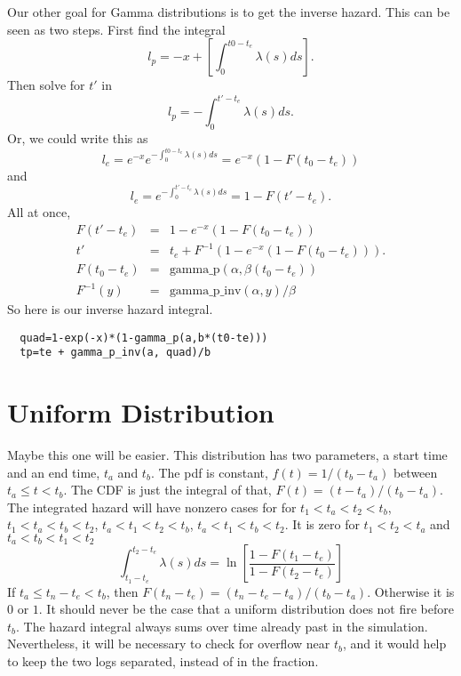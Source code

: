 \documentclass{article}
\begin{document}
Our other goal for Gamma distributions is to get the inverse hazard.
This can be seen as two steps. First find the integral
\begin{equation}
  l_p=-x+\left[\int_0^{t0-t_e}\lambda(s)ds\right].
\end{equation}
Then solve for $t'$ in
\begin{equation}
  l_p=-\int_0^{t'-t_e}\lambda(s)ds.
\end{equation}
Or, we could write this as
\begin{equation}
  l_e =e^{-x}e^{-\int_0^{t0-t_e}\lambda(s)ds}=e^{-x}(1-F(t_0-t_e))
\end{equation}
and
\begin{equation}
  l_e=e^{-\int_0^{t'-t_e}\lambda(s)ds}=1-F(t'-t_e).
\end{equation}
All at once,
\begin{eqnarray}
  F(t'-t_e)&=&1-e^{-x}(1-F(t_0-t_e)) \\
 t'&=&t_e+F^{-1}\left(1-e^{-x}(1-F(t_0-t_e))\right). \\
 F(t_0-t_e)&=&\mbox{gamma\_p}(\alpha,\beta(t_0-t_e)) \\
 F^{-1}(y)&=&\mbox{gamma\_p\_inv}(\alpha, y)/\beta
\end{eqnarray}
So here is our inverse hazard integral.
\begin{lstlisting}
  quad=1-exp(-x)*(1-gamma_p(a,b*(t0-te)))
  tp=te + gamma_p_inv(a, quad)/b
\end{lstlisting}

\section{Uniform Distribution}
Maybe this one will be easier.
This distribution has two parameters, a start time
and an end time, $t_a$ and $t_b$.
The pdf is constant, $f(t)=1/(t_b-t_a)$ between
$t_a\le t<t_b$. The CDF is just the integral of
that, $F(t)=(t-t_a)/(t_b-t_a)$.
The integrated hazard will have nonzero cases for
for $t_1<t_a<t_2<t_b$, $t_1<t_a<t_b<t_2$,
$t_a<t_1<t_2<t_b$, $t_a<t_1<t_b<t_2$.
It is zero for $t_1<t_2<t_a$ and $t_a<t_b<t_1<t_2$
\begin{equation}
  \int_{t_1-t_e}^{t_2-t_e}\lambda(s)ds=
      \ln\left[\frac{1-F(t_1-t_e)}{1-F(t_2-t_e)}\right]
\end{equation}
If $t_a\le t_n-t_e<t_b$, then $F(t_n-t_e)=(t_n-t_e-t_a)/(t_b-t_a)$.
Otherwise it is $0$ or $1$. It should never be the
case that a uniform distribution does not fire
before $t_b$. The hazard integral always sums over
time already past in the simulation. Nevertheless, it will
be necessary to check for overflow near $t_b$, and it
would help to keep the two logs separated, instead of
in the fraction.
\end{document}
